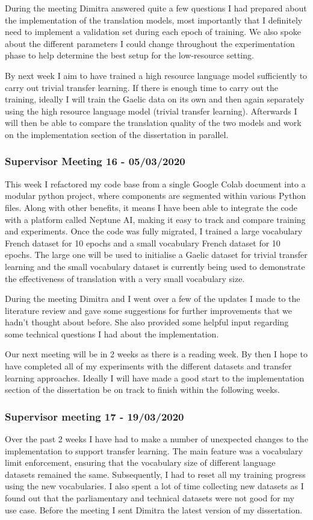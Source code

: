 During the meeting Dimitra answered quite a few questions I had prepared about the implementation of the translation models, most importantly that I definitely need to implement a validation set during each epoch of training. We also spoke about the different parameters I could change throughout the experimentation phase to help determine the best setup for the low-resource setting.

By next week I aim to have trained a high resource language model sufficiently to carry out trivial transfer learning. If there is enough time to carry out the training, ideally I will train the Gaelic data on its own and then again separately using the high resource language model (trivial transfer learning). Afterwards I will then be able to compare the translation quality of the two models and work on the implementation section of the dissertation in parallel.


\subsubsection{Supervisor Meeting 16 - 05/03/2020}
This week I refactored my code base from a single Google Colab document into a modular python project, where components are segmented within various Python files. Along with other benefits, it means I have been able to integrate the code with a platform called Neptune AI, making it easy to track and compare training and experiments. Once the code was fully migrated, I trained a large vocabulary French dataset for 10 epochs and a small vocabulary French dataset for 10 epochs. The large one will be used to initialise a Gaelic dataset for trivial transfer learning and the small vocabulary dataset is currently being used to demonstrate the effectiveness of translation with a very small vocabulary size.

During the meeting Dimitra and I went over a few of the updates I made to the literature review and gave some suggestions for further improvements that we hadn't thought about before. She also provided some helpful input regarding some technical questions I had about the implementation.

Our next meeting will be in 2 weeks as there is a reading week. By then I hope to have completed all of my experiments with the different datasets and transfer learning approaches. Ideally I will have made a good start to the implementation section of the dissertation be on track to finish within the following weeks.


\subsubsection{Supervisor meeting 17 - 19/03/2020}
Over the past 2 weeks I have had to make a number of unexpected changes to the implementation to support transfer learning. The main feature was a vocabulary limit enforcement, ensuring that the vocabulary size of different language datasets remained the same. Subsequently, I had to reset all my training progress using the new vocabularies. I also spent a lot of time collecting new datasets as I found out that the parliamentary and technical datasets were not good for my use case. Before the meeting I sent Dimitra the latest version of my dissertation.

